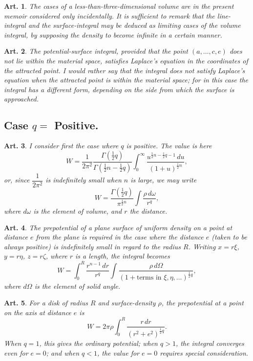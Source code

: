 \documentclass[12pt,a4paper]{article}
\theoremstyle{cayley}
\newtheorem{art}{Art.}[section]
\begin{document}
\begin{art}
The cases of a less-than-three-dimensional volume are in the present memoir considered only incidentally. It is sufficient to remark that the line-integral and the surface-integral may be deduced as limiting cases of the volume integral, by supposing the density to become infinite in a certain manner.
\end{art}

\begin{art}
The potential-surface integral, provided that the point $(a, \ldots, c, e)$ does not lie within the material space, satisfies Laplace's equation in the coordinates of the attracted point. I would rather say that the integral does not satisfy Laplace's equation when the attracted point is within the material space; for in this case the integral has a different form, depending on the side from which the surface is approached.
\end{art}

\subsection*{Case $q = $ Positive.}

\begin{art}
I consider first the case where $q$ is positive. The value is here
\[
W = \frac{1}{2\pi^2}\frac{\Gamma(\frac{1}{2}q)}{\Gamma(\frac{1}{2}n - \frac{1}{2}q)} \int_0^{\infty} \frac{u^{\frac{1}{2}n - \frac{1}{2}q - 1}\,du}{(1 + u)^{\frac{1}{2}n}},
\]
or, since $\dfrac{1}{2\pi^2}$ is indefinitely small when $n$ is large, we may write
\[
W = \frac{\Gamma(\frac{1}{2}q)}{\pi^{\frac{1}{2}n}} \int \frac{\rho\,d\omega}{r^q},
\]
where $d\omega$ is the element of volume, and $r$ the distance.
\end{art}

\begin{art}
The prepotential of a plane surface of uniform density on a point at distance $e$ from the plane is required in the case where the distance $e$ (taken to be always positive) is indefinitely small in regard to the radius $R$. Writing $x = r\xi$, $y = r\eta$, $z = r\zeta$, where $r$ is a length, the integral becomes
\[
W = \int_0^R \frac{r^{n-1}\,dr}{r^q} \int \frac{\rho\,d\Omega}{(1 + \text{terms in } \xi, \eta, \ldots)^{\frac{1}{2}q}},
\]
where $d\Omega$ is the element of solid angle.
\end{art}

\begin{art}
For a disk of radius $R$ and surface-density $\rho$, the prepotential at a point on the axis at distance $e$ is
\[
W = 2\pi\rho \int_0^R \frac{r\,dr}{(r^2 + e^2)^{\frac{1}{2}q}}.
\]
When $q=1$, this gives the ordinary potential; when $q > 1$, the integral converges even for $e=0$; and when $q < 1$, the value for $e=0$ requires special consideration.
\end{art}
\end{document}
